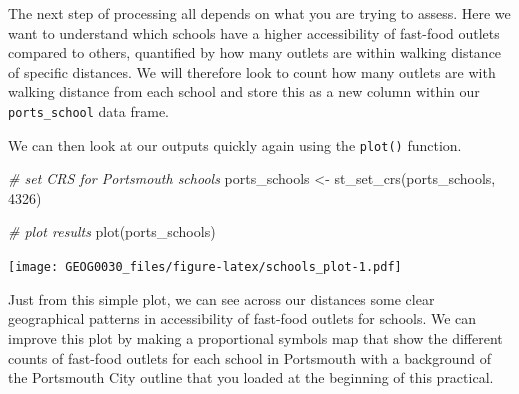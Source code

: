 \documentclass[
]{book}
\newenvironment{Shaded}{\begin{snugshade}}{\end{snugshade}}
\newcommand{\CommentTok}[1]{\textcolor[rgb]{0.56,0.35,0.01}{\textit{#1}}}
\newcommand{\DecValTok}[1]{\textcolor[rgb]{0.00,0.00,0.81}{#1}}
\newcommand{\FunctionTok}[1]{\textcolor[rgb]{0.00,0.00,0.00}{#1}}
\newcommand{\NormalTok}[1]{#1}
\newcommand{\OtherTok}[1]{\textcolor[rgb]{0.56,0.35,0.01}{#1}}
\newcommand{\SpecialCharTok}[1]{\textcolor[rgb]{0.00,0.00,0.00}{#1}}
\begin{document}
The next step of processing all depends on what you are trying to assess. Here we want to understand which schools have a higher accessibility of fast-food outlets compared to others, quantified by how many outlets are within walking distance of specific distances. We will therefore look to count how many outlets are with walking distance from each school and store this as a new column within our \texttt{ports\_school} data frame.

\begin{Shaded}
\end{Shaded}

We can then look at our outputs quickly again using the \texttt{plot()} function.

\begin{Shaded}
\begin{Highlighting}[]
\CommentTok{\# set CRS for Portsmouth schools}
\NormalTok{ports\_schools }\OtherTok{\textless{}{-}} \FunctionTok{st\_set\_crs}\NormalTok{(ports\_schools, }\DecValTok{4326}\NormalTok{)}

\CommentTok{\# plot results}
\FunctionTok{plot}\NormalTok{(ports\_schools)}
\end{Highlighting}
\end{Shaded}

\texttt{[image: GEOG0030\_files/figure-latex/schools\_plot-1.pdf]}

Just from this simple plot, we can see across our distances some clear geographical patterns in accessibility of fast-food outlets for schools. We can improve this plot by making a proportional symbols map that show the different counts of fast-food outlets for each school in Portsmouth with a background of the Portsmouth City outline that you loaded at the beginning of this practical.
\end{document}
